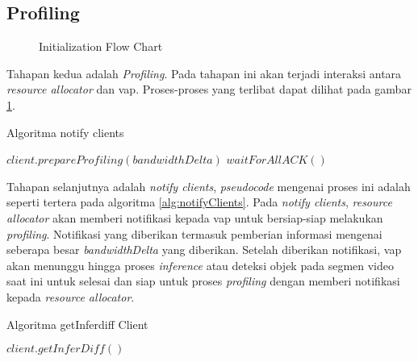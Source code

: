     \subsection{Profiling}\label{sec:profiling}

        \begin{figure}[tbh]
            \centering
            
            \caption{Initialization Flow Chart}\label{fig:profiling}
        \end{figure} 

        Tahapan kedua adalah \textit{Profiling}. Pada tahapan ini akan terjadi interaksi antara \textit{resource allocator} dan \gls{vap}. Proses-proses yang terlibat dapat dilihat pada gambar \ref{fig:profiling}. 

        \begin{algorithm}[tbh]
        \caption{Algoritma notify clients}\label{alg:notifyClients}
        \begin{algorithmic}[1]
        \State $client.prepareProfiling(bandwidthDelta)$
        \EndFor
        \State $waitForAllACK()$
        \EndProcedure
        \end{algorithmic}
        \end{algorithm}

        Tahapan selanjutnya adalah \textit{notify clients}, \textit{pseudocode} mengenai proses ini adalah seperti tertera pada algoritma \ref{alg:notifyClients}. Pada \textit{notify clients}, \textit{resource allocator} akan memberi notifikasi kepada \gls{vap} untuk bersiap-siap melakukan \textit{profiling}.  
        Notifikasi yang diberikan termasuk pemberian informasi mengenai seberapa
        besar \textit{bandwidthDelta} yang diberikan. Setelah diberikan notifikasi, \gls{vap} akan menunggu hingga proses \textit{inference} atau deteksi objek pada segmen video saat ini untuk selesai dan siap untuk proses \textit{profiling} dengan memberi notifikasi kepada \textit{resource allocator}.

        \begin{algorithm}[tbh]
            \caption{Algoritma getInferdiff Client}\label{alg:getInferdiffClient}
            \begin{algorithmic}
                \State $client.getInferDiff()$
                \EndFor
                \EndProcedure
            \end{algorithmic}
        \end{algorithm}

